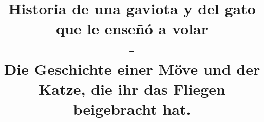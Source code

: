 \documentclass[fontsize=11pt]{scrartcl}
\begin{document}
\title{Historia de una gaviota y del gato que le enseñó a volar \\-\\ Die Geschichte einer Möve und der Katze, die ihr das Fliegen beigebracht hat.}
\date{}

\maketitle
\clearpage

\newcommand{\rn}[1]{\Rnode{#1}}
\newcommand{\rl}[2]{\ncline[linestyle=solid,arrows=->,nodesepA=0.5pt,linecolor=gray, strokeopacity=0.5]{#1}{#2}}
\newcommand{\sidenote}[1]{\marginpar[#1]{#1}}
\newcommand{\ul}[1]{\underline{#1}}
\newcommand{\fillmiss}{\rule{2cm}{0.4pt}~}
\newcommand{\choice}{$\Box$}
\newcommand{\correctchoice}{\framebox[1em]{\ding{51}}}
\newcommand{\falsechoice}{\framebox[1em]{\ding{53}}}
\newcommand{\correction}[1]{~\ding{43}~\textbf{\textsl{#1}}}

\newcommand{\mdash}{-}


\end{document}
